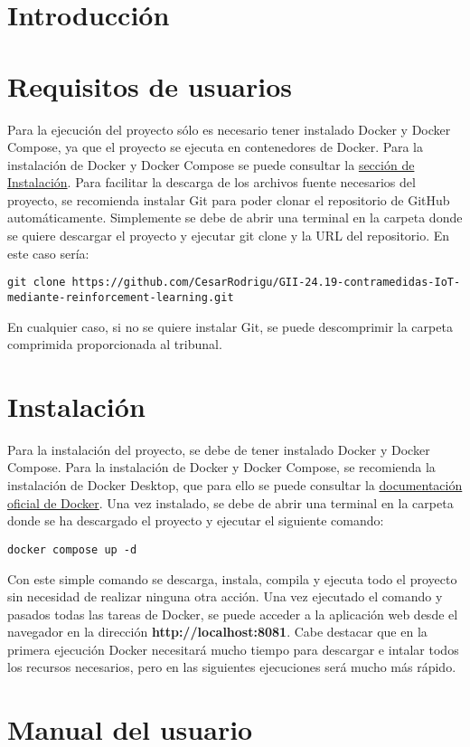 
\section{Introducción}

\section{Requisitos de usuarios}
\label{sec:requisitos-usuarios}

Para la ejecución del proyecto sólo es necesario tener instalado Docker y Docker Compose, ya que el proyecto se ejecuta en contenedores de Docker. Para la instalación de Docker y Docker Compose se puede consultar la \hyperref[sec:instalacion]{sección de Instalación}.
Para facilitar la descarga de los archivos fuente necesarios del proyecto, se recomienda instalar Git para poder clonar el repositorio de GitHub automáticamente. Simplemente se debe de abrir una terminal en la carpeta donde se quiere descargar el proyecto y ejecutar git clone y la URL del repositorio. En este caso sería:
\begin{verbatim}
git clone https://github.com/CesarRodrigu/GII-24.19-contramedidas-IoT-mediante-reinforcement-learning.git
\end{verbatim}
En cualquier caso, si no se quiere instalar Git, se puede descomprimir la carpeta comprimida proporcionada al tribunal.

\section{Instalación}
\label{sec:instalacion}
Para la instalación del proyecto, se debe de tener instalado Docker y Docker Compose. Para la instalación de Docker y Docker Compose, se recomienda la instalación de Docker Desktop, que para ello se puede consultar la \href{https://docs.docker.com/get-docker/}{documentación oficial de Docker}. Una vez instalado, se debe de abrir una terminal en la carpeta donde se ha descargado el proyecto y ejecutar el siguiente comando:
\begin{verbatim}
docker compose up -d
\end{verbatim}
Con este simple comando se descarga, instala, compila y ejecuta todo el proyecto sin necesidad de realizar ninguna otra acción.
Una vez ejecutado el comando y pasados todas las tareas de Docker, se puede acceder a la aplicación web desde el navegador en la dirección \textbf{http://localhost:8081}. Cabe destacar que en la primera ejecución Docker necesitará mucho tiempo para descargar e intalar todos los recursos necesarios, pero en las siguientes ejecuciones será mucho más rápido.
\section{Manual del usuario}


